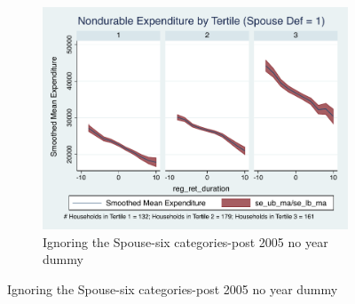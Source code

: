 \documentclass[11pt,onecolumn]{article}
\numberwithin{figure}{section}
\begin{document}
\begin{figure}
\begin{subfigure}{1.0\textwidth}
	\caption{Ignoring the Spouse-six categories-post 2005 no year dummy}
	\centering
	\includegraphics[width=0.8\linewidth]{../ConsumptionPostRetirement_by_SpouseDef/Smoothed/post_2005/six_cats/spouse_def_noyeard_1.pdf}
	\end{subfigure}
	\vspace{1cm}


\end{figure}
\end{document}
